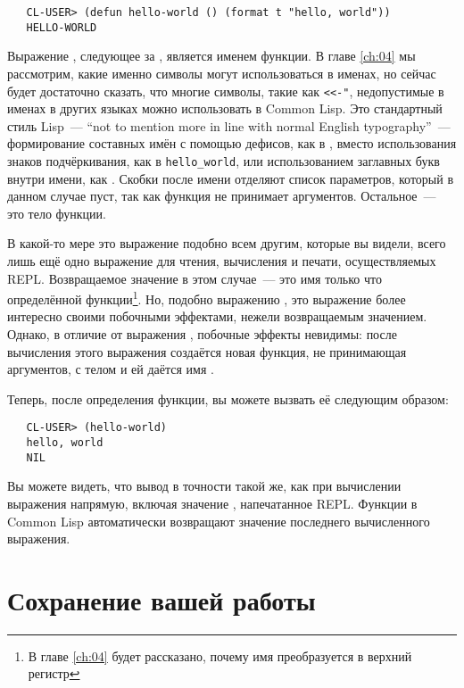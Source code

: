 \begin{verbatim}
   CL-USER> (defun hello-world () (format t "hello, world"))
   HELLO-WORLD
\end{verbatim}

Выражение , следующее за , является именем функции. В главе \ref{ch:04} мы
рассмотрим, какие именно символы могут использоваться в именах, но сейчас будет достаточно
сказать, что многие символы, такие как \lstinline|<<-"|, недопустимые в именах в других
языках можно использовать в Common Lisp. Это стандартный стиль Lisp~--- ``not to mention more
in line with normal English typography''~--- формирование составных имён с помощью дефисов,
как в , вместо использования знаков подчёркивания, как в \lstinline|hello_world|, или
использованием заглавных букв внутри имени, как . Скобки \code{()} после имени отделяют
список параметров, который в данном случае пуст, так как функция не принимает
аргументов. Остальное~--- это тело функции.

В какой-то мере это выражение подобно всем другим, которые вы видели, всего лишь ещё одно
выражение для чтения, вычисления и печати, осуществляемых REPL. Возвращаемое значение в
этом случае~--- это имя только что определённой функции\footnote{В главе \ref{ch:04} будет рассказано,
  почему имя преобразуется в верхний регистр}. Но, подобно выражению , это выражение
более интересно своими побочными эффектами, нежели возвращаемым значением. Однако, в
отличие от выражения , побочные эффекты невидимы: после вычисления этого выражения
создаётся новая функция, не принимающая аргументов, с телом  и ей даётся имя .

Теперь, после определения функции, вы можете вызвать её следующим образом:

\begin{verbatim}
   CL-USER> (hello-world)
   hello, world
   NIL
\end{verbatim}

Вы можете видеть, что вывод в точности такой же, как при вычислении выражения 
напрямую, включая значение , напечатанное REPL. Функции в Common Lisp автоматически
возвращают значение последнего вычисленного выражения.

\section{Сохранение вашей работы}

